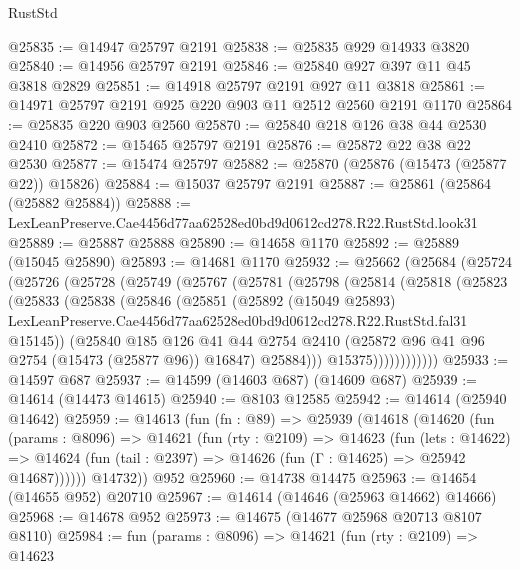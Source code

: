 \begin{lexlean}{RustStd}
\begin{coremodule}
@25835 := @14947 @25797 @2191
@25838 := @25835 @929 @14933 @3820
@25840 := @14956 @25797 @2191
@25846 := @25840 @927 @397 @11 @45 @3818 @2829
@25851 := @14918 @25797 @2191 @927 @11 @3818
@25861 := @14971 @25797 @2191 @925 @220 @903 @11 @2512 @2560 @2191 @1170
@25864 := @25835 @220 @903 @2560
@25870 := @25840 @218 @126 @38 @44 @2530 @2410
@25872 := @15465 @25797 @2191
@25876 := @25872 @22 @38 @22 @2530
@25877 := @15474 @25797
@25882 := @25870 (@25876 (@15473 (@25877 @22)) @15826)
@25884 := @15037 @25797 @2191
@25887 := @25861 (@25864 (@25882 @25884))
@25888 := LexLeanPreserve.Cae4456d77aa62528ed0bd9d0612cd278.R22.RustStd.look31
@25889 := @25887 @25888
@25890 := @14658 @1170
@25892 := @25889 (@15045 @25890)
@25893 := @14681 @1170
@25932 := @25662
    (@25684
      (@25724
        (@25726
          (@25728
            (@25749
              (@25767
                (@25781
                  (@25798
                    (@25814
                      (@25818
                        (@25823
                          (@25833
                            (@25838
                              (@25846
                                (@25851
                                  (@25892
                                    (@15049 @25893)
                                    LexLeanPreserve.Cae4456d77aa62528ed0bd9d0612cd278.R22.RustStd.fal31
                                    @15145))
                                (@25840
                                  @185
                                  @126
                                  @41
                                  @44
                                  @2754
                                  @2410
                                  (@25872 @96 @41 @96 @2754 (@15473 (@25877 @96)) @16847)
                                  @25884)))
                            @15375))))))))))))
@25933 := @14597 @687
@25937 := @14599 (@14603 @687) (@14609 @687)
@25939 := @14614 (@14473 @14615)
@25940 := @8103 @12585
@25942 := @14614 (@25940 @14642)
@25959 := @14613
    (fun (fn : @89) =>
    @25939
      (@14618
        (@14620
          (fun (params : @8096) =>
          @14621
            (fun (rty : @2109) =>
            @14623
              (fun (lets : @14622) =>
              @14624 (fun (tail : @2397) => @14626 (fun (Γ : @14625) => @25942 @14687))))))
        @14732))
    @952
@25960 := @14738 @14475
@25963 := @14654 (@14655 @952) @20710
@25967 := @14614 (@14646 (@25963 @14662) @14666)
@25968 := @14678 @952
@25973 := @14675 (@14677 @25968 @20713 @8107 @8110)
@25984 := fun (params : @8096) =>
  @14621
    (fun (rty : @2109) =>
    @14623

\end{coremodule}
\end{lexlean}
